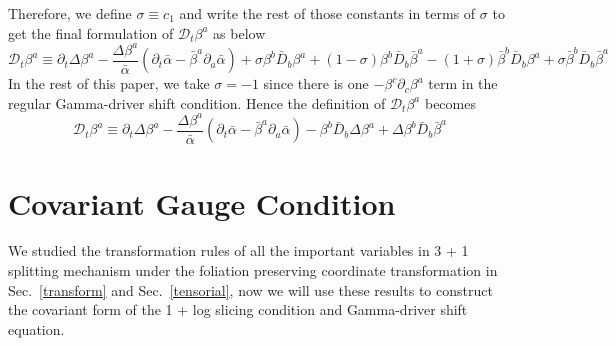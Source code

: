 \documentclass[letterpaper,nofootinbib,prd,amsmath,onecolumn]{revtex4-1}
\begin{document}
Therefore, we define $\sigma \equiv c_{1}$ and write the rest of those constants in terms of $\sigma$ to get the final formulation of $\mathscr{D}_{t}\beta^{a}$ as below
\begin{equation}
\mathscr{D}_{t}\beta^{a} \equiv \partial_{t}\Delta \beta^{a} - \frac{\Delta \beta^{a}}{{\bar \alpha}}\left(\partial_{t}{\bar \alpha} - {\bar \beta}^{a}\partial_{a}{\bar \alpha}\right) + \sigma\beta^{b}{\bar D}_{b}\beta^{a} + \left(1-\sigma\right)\beta^{b}{\bar D}_{b}{\bar \beta}^{a} - \left(1 + \sigma\right){\bar \beta}^{b}{\bar D}_{b}\beta^{a} + \sigma{\bar \beta}^{b}{\bar D}_{b}{\bar \beta}^{a}
\end{equation}
In the rest of this paper, we take $\sigma = -1$ since there is one $-\beta^{c}\partial_{c}\beta^{a}$ term in the regular Gamma-driver shift condition. Hence the definition of $\mathscr{D}_{t}\beta^{a}$ becomes
\begin{equation}
\mathscr{D}_{t}\beta^{a} \equiv \partial_{t}\Delta \beta^{a} - \frac{\Delta \beta^{a}}{{\bar \alpha}}\left(\partial_{t}{\bar \alpha} - {\bar \beta}^{a}\partial_{a}{\bar \alpha}\right) - \beta^{b}{\bar D}_{b}\Delta \beta^{a} + \Delta \beta^{b}{\bar D}_{b}{\bar \beta}^{a}
\end{equation}

\section{Covariant Gauge Condition}\label{gauge}
We studied the transformation rules of all the important variables in 3 + 1 splitting mechanism under the foliation preserving coordinate transformation in Sec.~\ref{transform} and Sec.~\ref{tensorial}, now we will use these results to construct the covariant form of the 1 + log slicing condition and Gamma-driver shift equation. 
\end{document}

